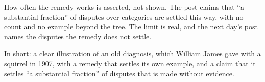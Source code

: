 \begin{afterword}
How often the remedy works is asserted, not shown. The post claims that ``a substantial fraction'' of disputes over categories are settled this way, with no count and no example beyond the tree. The limit is real, and the next day's post names the disputes the remedy does not settle.

In short: a clear illustration of an old diagnosis, which William James gave with a squirrel in 1907, with a remedy that settles its own example, and a claim that it settles ``a substantial fraction'' of disputes that is made without evidence.
\end{afterword}
